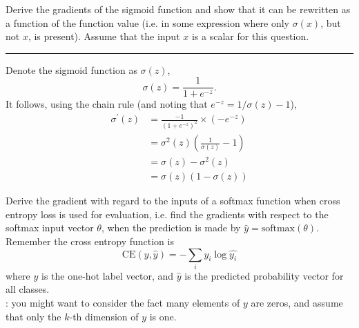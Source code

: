 
\bigskip

\noindent Derive the gradients of the sigmoid function and show that it can be rewritten as a function of the 
function value (i.e. in some expression where only $\sigma(x)$, but not $x$, is present). Assume that the input
$x$ is a scalar for this question.

\noindent\rule{\textwidth}{0.4pt}
 
\noindent Denote the sigmoid function as $\sigma(z)$,
\begin{equation}
\sigma(z) = \frac{1}{1 + e^{-z}}.
\end{equation}
It follows, using the chain rule (and noting that $e^{-z}= 1/\sigma(z) -1$),
\begin{align*}
\sigma^{\prime}(z) &= \frac{-1}{(1+e^{-z})^{2}}\times(-e^{-z})\\
                                &= \sigma^{2}(z)\left(\frac{1}{\sigma(z)} - 1 \right)\\
                                &= \sigma(z) - \sigma^{2}(z)\\
                                &= \sigma(z)(1 - \sigma(z))
\end{align*}
 
\clearpage
\pagestyle{myheadings}

\bigskip

\noindent Derive the gradient with regard to the inputs of a softmax function when cross entropy loss is used for
evaluation, i.e. find the gradients with respect to the softmax input vector $\theta$, when the prediction is
made by $\hat{y} = \textrm{softmax}(\theta)$. Remember the cross entropy function is
\begin{equation}
\textrm{CE}(y,\hat{y}) = -\sum_{i}{y_{i}\log{\hat{y_{i}}}}
\end{equation}
where $y$ is the one-hot label vector, and $\hat{y}$ is the predicted probability vector for all classes. \vspace{2mm}\\
: you might want to consider the fact many elements of $y$ are zeros, and assume that only the $k$-th dimension
of $y$ is one.

\clearpage

\bigskip

